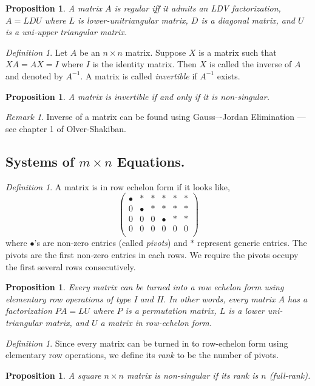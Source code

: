 \documentclass[12pt]{amsart}
\newtheorem{proposition}[theorem]{Proposition}
\theoremstyle{remark}
\newtheorem{remark}[theorem]{Remark}
\newtheorem{definition}[theorem]{Definition}
\numberwithin{equation}{section}
\begin{document}
\begin{proposition}
	A matrix $A$ is regular iff it admits an LDV factorization, $A=LDU$ where $L$ is lower-unitriangular matrix, $D$ is a diagonal matrix, and $U$ is a uni-upper triangular matrix.
\end{proposition}
\begin{definition}
	Let $A$ be an $n\times n$ matrix. Suppose $X$ is a matrix such that $XA=AX=I$ where $I$ is the identity matrix. Then $X$ is called the inverse of $A$ and denoted by $A^{-1}$. A matrix is called \emph{invertible} if $A^{-1}$ exists.
\end{definition}
\begin{proposition}
	A matrix is invertible if and only if it is non-singular.
\end{proposition}
\begin{remark}
	Inverse of a matrix can be found using Gauss–-Jordan Elimination --- see chapter 1 of Olver-Shakiban.
\end{remark}
	

\subsection{Systems of $m\times n$ Equations.}
\begin{definition}
A matrix is in row echelon form if it looks like,
	\[
\begin{pmatrix}
\bullet & * & * & * & * & * \\
0 & \bullet & * & * & * & * \\
0 & 0 & 0 & \bullet & * & * \\
0 & 0 & 0 & 0 & 0 & 0 \\
\end{pmatrix}
\]
where $\bullet$'s are non-zero entries (called \emph{pivots}) and $*$ represent generic entries. The pivots are the first non-zero entries in each rows. We require the pivots occupy the first several rows consecutively.
\end{definition}
\begin{proposition}
	Every matrix can be turned into a row echelon form using elementary row operations of type I and II. In other words, every matrix $A$ has a factorization $PA=LU$ where $P$ is a permutation matrix, $L$ is a lower uni-triangular matrix, and $U$ a matrix in row-echelon form.
\end{proposition}
\begin{definition}\label{def:rank}
	Since every matrix can be turned in to row-echelon form using elementary row operations, we define its \emph{rank} to be the number of pivots.
\end{definition}
\begin{proposition}
	A square $n\times n$ matrix is non-singular if its rank is $n$ (full-rank).
\end{proposition}
\end{document}
